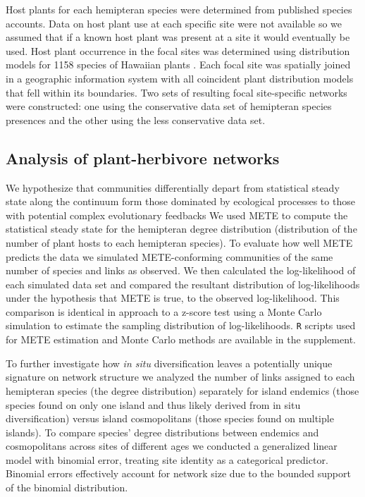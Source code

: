 \documentclass[12pt]{article}
\begin{document}
\begin{linenumbers}
Host plants for each hemipteran species were determined from published
species accounts. Data on host plant use at each specific site were
not available so we assumed that if a known host plant was present at
a site it would eventually be used. Host plant occurrence in the focal
sites was determined using distribution models for 1158 species of
Hawaiian plants \citep{price2012}. Each focal site was spatially
joined in a geographic information system with all coincident plant
distribution models that fell within its boundaries. Two sets of
resulting focal site-specific networks were constructed: one using the
conservative data set of hemipteran species presences and the other
using the less conservative data set.

\subsection*{Analysis of plant-herbivore networks}

We hypothesize that communities differentially depart from statistical
steady state along the continuum form those dominated by ecological
processes to those with potential complex evolutionary feedbacks We
used METE \citep{williams2010, harte2011} to compute the statistical
steady state for the hemipteran degree distribution (distribution of
the number of plant hosts to each hemipteran species). To evaluate how
well METE predicts the data we simulated METE-conforming communities
of the same number of species and links as observed. We then
calculated the log-likelihood of each simulated data set and compared
the resultant distribution of log-likelihoods under the hypothesis
that METE is true, to the observed log-likelihood. This comparison is
identical in approach to a z-score test using a Monte Carlo simulation
to estimate the sampling distribution of log-likelihoods. {\tt R}
scripts used for METE estimation and Monte Carlo methods are
available in the supplement.

To further investigate how {\it in situ} diversification leaves a
potentially unique signature on network structure we analyzed the
number of links assigned to each hemipteran species (the degree
distribution) separately for island endemics (those species found on
only one island and thus likely derived from in situ diversification)
versus island cosmopolitans (those species found on multiple
islands). To compare species' degree distributions between endemics
and cosmopolitans across sites of different ages we conducted a
generalized linear model with binomial error, treating site identity
as a categorical predictor. Binomial errors effectively account for
network size due to the bounded support of the binomial distribution.


\end{linenumbers}
\end{document}
